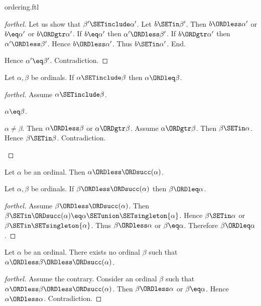 \documentclass{naproche-library}
\begin{document}
\begin{smodule}[title=The Standard Ordering of the Ordinals]{ordering.ftl}
\begin{proof}[forthel]
  Let us show that $\beta' \SETinclude \alpha'$.
    Let $b \SETin \beta'$.
    Then $b \ORDless \alpha'$ or $b \eq \alpha'$ or $b \ORDgtr \alpha'$.
    If $b \eq \alpha'$ then $\alpha' \ORDless \beta'$.
    If $b \ORDgtr \alpha'$ then $\alpha' \ORDless \beta'$.
    Hence $b \ORDless \alpha'$.
    Thus $b \SETin \alpha'$.
  End.

  Hence $\alpha' \eq \beta'$.
  Contradiction.
\end{proof}

\begin{proposition}[forthel,id=SET_THEORY_02_610496856195072]
  Let $\alpha, \beta$ be ordinals.
  If $\alpha \SETinclude \beta$ then $\alpha \ORDleq \beta$.
\end{proposition}
\begin{proof}[forthel]
  Assume $\alpha \SETinclude \beta$.

  \begin{case}{$\alpha \eq \beta$.} \end{case}

  \begin{case}{$\alpha \neq \beta$.}
    Then $\alpha \ORDless \beta$ or $\alpha \ORDgtr \beta$.
    Assume $\alpha \ORDgtr \beta$.
    Then $\beta \SETin \alpha$.
    Hence $\beta \SETin \beta$.
    Contradiction.
  \end{case}
\end{proof}

\begin{proposition}[forthel,id=SET_THEORY_02_5689190964527104]
  Let $\alpha$ be an ordinal.
  Then $\alpha \ORDless \ORDsucc(\alpha)$.
\end{proposition}

\begin{proposition}[forthel,id=SET_THEORY_02_4064972025888768]
  Let $\alpha, \beta$ be ordinals.
  If $\beta \ORDless \ORDsucc(\alpha)$ then $\beta \ORDleq \alpha$.
\end{proposition}
\begin{proof}[forthel]
  Assume $\beta \ORDless \ORDsucc(\alpha)$.
  Then $\beta \SETin \ORDsucc(\alpha) \eq \alpha \SETunion \SETsingleton{\alpha}$.
  Hence $\beta \SETin \alpha$ or $\beta \SETin \SETsingleton{\alpha}$.
  Thus $\beta \ORDless \alpha$ or $\beta \eq \alpha$.
  Therefore $\beta \ORDleq \alpha$.
\end{proof}

\begin{proposition}[forthel,id=SET_THEORY_02_8242798790705152]
  Let $\alpha$ be an ordinal.
  There exists no ordinal $\beta$ such that $\alpha \ORDless \beta \ORDless \ORDsucc(\alpha)$.
\end{proposition}
\begin{proof}[forthel]
  Assume the contrary.
  Consider an ordinal $\beta$ such that $\alpha \ORDless \beta \ORDless \ORDsucc(\alpha)$.
  Then $\beta \ORDless \alpha$ or $\beta \eq \alpha$.
  Hence $\alpha \ORDless \alpha$.
  Contradiction.
\end{proof}


\end{smodule}
\end{document}
